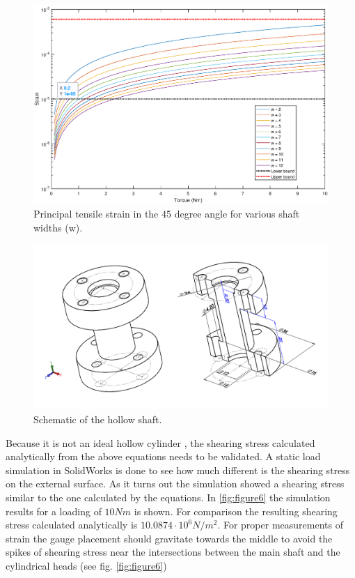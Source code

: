 \begin{figure}[h]
\centering
\captionsetup{justification=centering,margin=2cm}
\includegraphics[scale=0.5]{images/figure4.eps}
	\caption[Short title]{Principal tensile strain in the 45 degree angle for various shaft widths (w).}
\label{fig:figure4}
\end{figure}


\begin{figure}[h]
\centering
\captionsetup{justification=centering,margin=2cm}

\includegraphics[scale=0.4]{images/sensor_schematic.png}
	\caption[Short title]{Schematic of the hollow shaft.}
\label{fig:figure5}
\end{figure}
\newpage
Because it is not an ideal hollow cylinder , the shearing stress  calculated analytically from the above equations needs to be validated. A static load simulation in SolidWorks is done to see how much different  is the shearing stress on the external surface. As it turns out the simulation showed a shearing stress similar to the one calculated by the equations. In \ref{fig:figure6} the simulation results for a loading of \ensuremath{10 Nm} is shown. For comparison the resulting shearing stress calculated analytically  is \ensuremath{10.0874\cdot 10^6 N/m^2 }. For proper measurements of  strain  the gauge  placement should gravitate towards the middle to avoid the spikes of shearing stress near the intersections between the main shaft and the cylindrical heads (see fig. \ref{fig:figure6})

